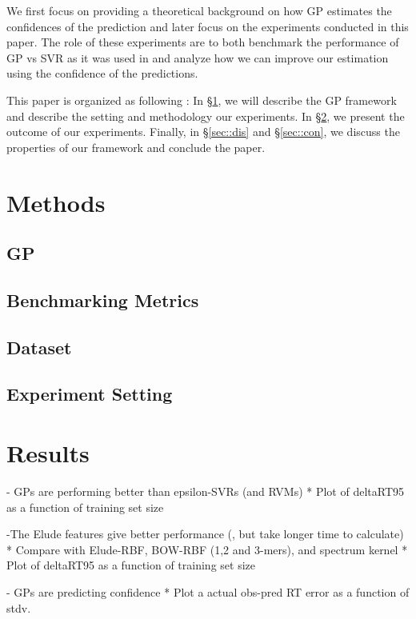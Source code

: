 \documentclass{bioinfo}
\begin{document}
We first focus on providing a theoretical background on how GP estimates the confidences of the prediction and later focus on the experiments conducted in this paper. The role of these experiments are to both benchmark the performance of GP vs SVR as it was used in \cite{elude} and analyze how we can improve our estimation using the confidence of the predictions.

This paper is organized as following : In \S\ref{sec::method}, we will describe the GP framework and describe the setting and methodology our experiments. In \S\ref{sec::results}, we present the outcome of our experiments. Finally, in \S\ref{sec::dis} and \S\ref{sec::con}, we discuss the properties of our framework and conclude the paper.
\begin{methods}
\section{Methods}
\label{sec::method}

\subsection{GP}
\subsection{Benchmarking Metrics}
\subsection{Dataset}
\subsection{Experiment Setting}


\section{Results}
\label{sec::results}

- GPs are performing better than epsilon-SVRs (and RVMs)
* Plot of deltaRT95 as a function of training set size

-The Elude features give better performance (, but take longer time to calculate)
* Compare with Elude-RBF, BOW-RBF (1,2 and 3-mers), and spectrum kernel
* Plot of deltaRT95 as a function of training set size

- GPs are predicting confidence
* Plot a actual obs-pred RT error as a function of stdv.


\end{methods}
\end{document}
